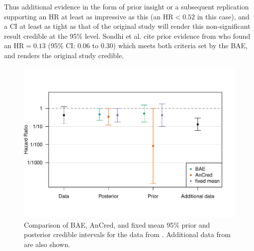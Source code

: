 Thus additional evidence in the form of prior insight or a subsequent
replication supporting an HR at least as impressive as this (\ie an
$\mbox{HR} < 0.52$ in this case), and a CI at least as tight as that of the
original study will render this non-significant result credible at the 95\%
level. Sondhi et al. cite prior evidence from \citet{Innocenti2019} who found an
$\mbox{HR} = 0.13$ (95\% CI: 0.06 to 0.30) which meets both criteria set by the
BAE, and renders the original study credible.





\begin{figure}[!htb]
\begin{knitrout}
\color{fgcolor}
\includegraphics[width=\maxwidth]{images/paper5/bae-comparison-fig-1}
\end{knitrout}
\caption{Comparison of BAE, AnCred, and fixed mean 95\% prior and posterior
  credible intervals for the data from \citet{Sondhi2021}. Additional data from
  \citet{Innocenti2019} are also shown.}
\label{fig5:illustration}
\end{figure}


